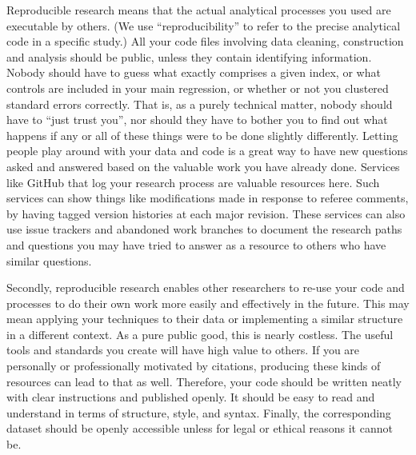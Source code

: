 Reproducible research means that the actual analytical processes you used are executable by others.\cite{dafoe2014science}
(We use ``reproducibility'' to refer to the precise analytical code in a specific study.)
All your code files involving data cleaning, construction and analysis
should be public, unless they contain identifying information.
Nobody should have to guess what exactly comprises a given index,
or what controls are included in your main regression,
or whether or not you clustered standard errors correctly.
That is, as a purely technical matter, nobody should have to ``just trust you'',
nor should they have to bother you to find out what happens
if any or all of these things were to be done slightly differently.\cite{simmons2011false,simonsohn2015specification,wicherts2016degrees}
Letting people play around with your data and code
is a great way to have new questions asked and answered
based on the valuable work you have already done.
Services like GitHub
that log your research process are valuable resources here.
Such services can show things like modifications made in response to referee comments,
by having tagged version histories at each major revision.
These services can also use issue trackers and abandoned work branches
to document the research paths and questions you may have tried to answer
as a resource to others who have similar questions.

Secondly, reproducible research
enables other researchers to re-use your code and processes
to do their own work more easily and effectively in the future.
This may mean applying your techniques to their data
or implementing a similar structure in a different context.
As a pure public good, this is nearly costless.
The useful tools and standards you create will have high value to others.
If you are personally or professionally motivated by citations,
producing these kinds of resources can lead to that as well.
Therefore, your code should be written neatly with clear instructions and published openly.
It should be easy to read and understand in terms of structure, style, and syntax.
Finally, the corresponding dataset should be openly accessible
unless for legal or ethical reasons it cannot be.

